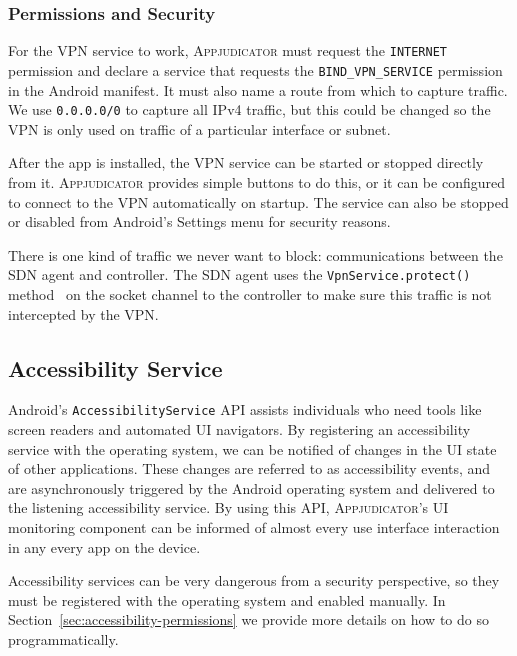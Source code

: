 \subsubsection{Permissions and Security}
\label{sec:vpn-permissions}

For the VPN service to work, \textsc{Appjudicator} must request the
\texttt{INTERNET} permission and declare a service that requests the
\texttt{BIND\_VPN\_SERVICE} permission in the Android manifest. It must also
name a route from which to capture traffic. We use \texttt{0.0.0.0/0} to capture
all IPv4 traffic, but this could be changed so the VPN is only used on traffic
of a particular interface or subnet.

After the app is installed, the VPN service can be started or stopped directly
from it. \textsc{Appjudicator} provides simple buttons to do this, or it can be
configured to connect to the VPN automatically on startup. The service can also
be stopped or disabled from Android's Settings menu for security reasons.

There is one kind of traffic we never want to block: communications between the
SDN agent and controller. The SDN agent uses the \texttt{VpnService.protect()}
method~\cite{googledevelopers2020vpn} on the socket channel to the controller to
make sure this traffic is not intercepted by the VPN.


\subsection{Accessibility Service}
\label{sec:implementation-accessibility-service}

Android's \texttt{AccessibilityService} API assists individuals who need tools
like screen readers and automated UI navigators. By registering an accessibility
service with the operating system, we can be notified of changes in the UI state
of other applications. These changes are referred to as accessibility events,
and are asynchronously triggered by the Android operating system and delivered
to the listening accessibility service. By using this API,
\textsc{Appjudicator}'s UI monitoring component can be informed of almost every
use interface interaction in any every app on the device.

Accessibility services can be very dangerous from a security perspective, so they
must be registered with the operating system and enabled manually. In
Section~\ref{sec:accessibility-permissions} we provide more details on how to do
so programmatically.

